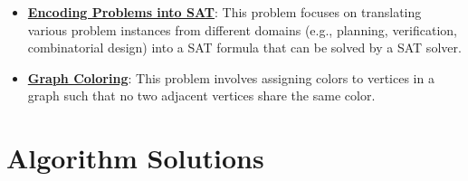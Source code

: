 \documentclass{article}%
\begin{document}
\begin{itemize}[leftmargin=*]
\item \href{https://purdue.brightspace.com/d2l/common/assets/pdfjs-d2l-dist/1.0.14-legacy/web/viewer.html?file=\%2Fcontent\%2Fenforced\%2F1095467-wl.202510.CS.24300.001\%2F15L2-SAT.pdf\%3Fou\%3D1095467\&lang=en-us\&container=d2l-fileviewer-rendered-pdf\&fullscreen=d2l-fileviewer-rendered-pdf-dialog\&height=667#page=40}{\textbf{Encoding Problems into SAT}}: This problem focuses on translating various problem instances from different domains (e.g., planning, verification, combinatorial design) into a SAT formula that can be solved by a SAT solver.%
\item \href{https://purdue.brightspace.com/d2l/common/assets/pdfjs-d2l-dist/1.0.14-legacy/web/viewer.html?file=\%2Fcontent\%2Fenforced\%2F1095467-wl.202510.CS.24300.001\%2F15L2-SAT.pdf\%3Fou\%3D1095467\&lang=en-us\&container=d2l-fileviewer-rendered-pdf\&fullscreen=d2l-fileviewer-rendered-pdf-dialog\&height=667#page=47}{\textbf{Graph Coloring}}: This problem involves assigning colors to vertices in a graph such that no two adjacent vertices share the same color.%
\end{itemize}

%
\section{Algorithm Solutions}%
\label{sec:AlgorithmSolutions}%
\end{document}
